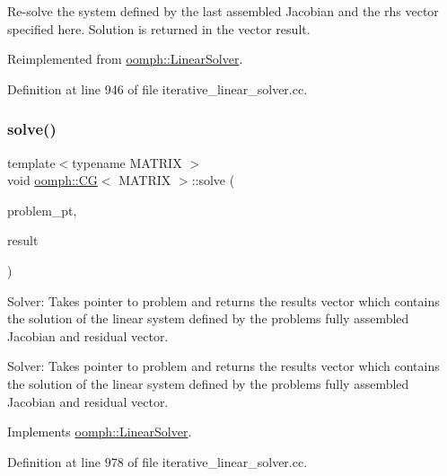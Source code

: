 Re-\/solve the system defined by the last assembled Jacobian and the rhs vector specified here. Solution is returned in the vector result. 



Reimplemented from \hyperlink{classoomph_1_1LinearSolver_a3b310d08333033edc119b2a5bd7dcbfb}{oomph\+::\+Linear\+Solver}.



Definition at line 946 of file iterative\+\_\+linear\+\_\+solver.\+cc.

\mbox{\label{classoomph_1_1CG_a3ae0fb5451136aec30defea2758c8c5d}} 
\subsubsection{\texorpdfstring{solve()}{solve()}\hspace{0.1cm}{\footnotesize\ttfamily [1/2]}}
{\footnotesize\ttfamily template$<$typename M\+A\+T\+R\+IX $>$ \\
void \hyperlink{classoomph_1_1CG}{oomph\+::\+CG}$<$ M\+A\+T\+R\+IX $>$\+::solve (\begin{DoxyParamCaption}\item[{\hyperlink{classoomph_1_1Problem}{Problem} $\ast$const \&}]{problem\+\_\+pt,  }\item[{\hyperlink{classoomph_1_1DoubleVector}{Double\+Vector} \&}]{result }\end{DoxyParamCaption})\hspace{0.3cm}{\ttfamily [virtual]}}



Solver\+: Takes pointer to problem and returns the results vector which contains the solution of the linear system defined by the problem\textquotesingle{}s fully assembled Jacobian and residual vector. 

Solver\+: Takes pointer to problem and returns the results vector which contains the solution of the linear system defined by the problem\textquotesingle{}s fully assembled Jacobian and residual vector. 

Implements \hyperlink{classoomph_1_1LinearSolver_a15ce22542b74ed1826ea485edacbeb6e}{oomph\+::\+Linear\+Solver}.



Definition at line 978 of file iterative\+\_\+linear\+\_\+solver.\+cc.



